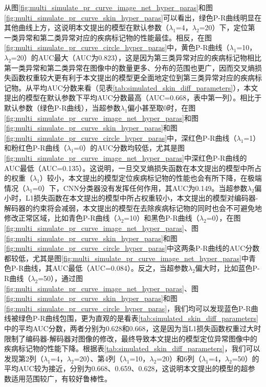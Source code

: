 从图\ref{fig:multi_simulate_pr_curve_image_net_hyper_paras}和图\ref{fig:multi_simulate_pr_curve_skin_hyper_paras}可以看出，绿色P-R曲线明显在其他曲线上方，这说明本文提出的模型在默认参数（$\lambda_{1}$=4，$\lambda_{2}$=20）下，定位第一类异常和第二类异常对应的疾病标记物的性能最佳。相反，在图\ref{fig:multi_simulate_pr_curve_circle_hyper_paras}中，黄色P-R曲线（$\lambda_{1}$=10，$\lambda_{2}$=20）的AUC最大（AUC为0.823），这是因为第三类异常对应的疾病标记物相比第一类异常和第二类异常在图像中的数量更多、分布的范围也更广，因而交叉熵损失函数权重较大更有利于本文提出的模型更全面地定位到第三类异常对应的疾病标记物。从平均AUC分数来看（见表\ref{tab:simulated_skin_diff_parameters}），本文提出的模型在默认参数下平均AUC分数最高（AUC=0.668，表中第一列）。相比于默认参数（绿色P-R曲线），当超参数$\lambda_{1}$偏小甚至取0时，在图\ref{fig:multi_simulate_pr_curve_image_net_hyper_paras}和图\ref{fig:multi_simulate_pr_curve_skin_hyper_paras}和图\ref{fig:multi_simulate_pr_curve_circle_hyper_paras}中，深红色P-R曲线（$\lambda_{1}$=1）和粉红色P-R曲线（$\lambda_{1}$=0）的AUC分数均较低，尤其是图\ref{fig:multi_simulate_pr_curve_image_net_hyper_paras}中深红色P-R曲线的AUC最低（AUC=0.135）。这说明，一旦交叉熵损失函数在本文提出的模型中所占的权重（$\lambda_{1}$）较小，本文提出的模型定位疾病标记物的性能也会有所下降，在极端情况（$\lambda_{1}$=0）下，CNN分类器没有发挥任何作用，其AUC为0.149。当超参数$\lambda_{2}$偏小时，L1损失函数在本文提出的模型中所占权重较小，本文提出的模型对编码器-解码器的约束将会减弱，本文提出的模型在去除疾病标记物的同时也会不可避免地修改正常区域，比如青色P-R曲线（$\lambda_{2}$=10）和黑色P-R曲线（$\lambda_2$=0），在图\ref{fig:multi_simulate_pr_curve_image_net_hyper_paras}、图\ref{fig:multi_simulate_pr_curve_skin_hyper_paras}和图\ref{fig:multi_simulate_pr_curve_circle_hyper_paras}中这两条P-R曲线的AUC分数都较低，尤其是图\ref{fig:multi_simulate_pr_curve_image_net_hyper_paras}中青色P-R曲线，其AUC最低（AUC=0.084）。反之，当超参数$\lambda_{2}$偏大时，比如蓝色P-R曲线（$\lambda_{2}$=50），通过图\ref{fig:multi_simulate_pr_curve_image_net_hyper_paras}、图\ref{fig:multi_simulate_pr_curve_skin_hyper_paras}和图\ref{fig:multi_simulate_pr_curve_circle_hyper_paras}，我们均可以发现蓝色P-R曲线被绿色P-R曲线包围，更为直观的是看表\ref{tab:simulated_skin_diff_parameters}中的平均AUC分数，两者分别为0.628和0.668，这是因为当L1损失函数权重过大时限制了编码器-解码器对图像的修改，最终导致本文提出的模型定位异常图像中的疾病标记物的性能下降。根据表\ref{tab:simulated_skin_diff_parameters}，我们可以发现第2列（$\lambda_{1}$=4，$\lambda_{2}$=20）、第4列（$\lambda_{1}$=10，$\lambda_{2}$=20）和6列（$\lambda_{1}$=4，$\lambda_{2}$=50）的平均AUC较为接近，分别为0.668、0.659、0.628，这说明本文提出的模型的超参数适用范围较广，有较好鲁棒性。

